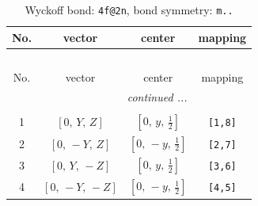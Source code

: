 \documentclass[fleqn,8pt]{jsarticle}
\begin{document}
\renewcommand{\arraystretch}{1.2}
\begin{longtable}{cccc}
\caption{Wyckoff bond: {\tt 4f@2n}, bond symmetry: {\tt m..}}
 \\
 \hline \hline
No. & vector & center & mapping \\ \hline \endfirsthead

\multicolumn{3}{l}{\tablename\ \thetable{}} \\
 \hline \hline
No. & vector & center & mapping \\ \hline \endhead

 \hline \hline
\multicolumn{3}{r}{\footnotesize\it continued ...} \\ \endfoot

 \hline \hline
\multicolumn{3}{r}{} \\ \endlastfoot

1 & $\left[ 0,\, Y,\, Z \right]$ & $\left[ 0,\, y,\, \frac{1}{2} \right]$ & {\tt [1,8]} \\ \hline
2 & $\left[ 0,\, - Y,\, Z \right]$ & $\left[ 0,\, - y,\, \frac{1}{2} \right]$ & {\tt [2,7]} \\ \hline
3 & $\left[ 0,\, Y,\, - Z \right]$ & $\left[ 0,\, y,\, \frac{1}{2} \right]$ & {\tt [3,6]} \\ \hline
4 & $\left[ 0,\, - Y,\, - Z \right]$ & $\left[ 0,\, - y,\, \frac{1}{2} \right]$ & {\tt [4,5]} \\
\end{longtable}
\renewcommand{\arraystretch}{1.2}
\end{document}
